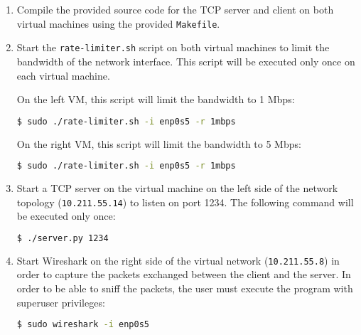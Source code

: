 \documentclass[a4paper, 11pt]{article}
\begin{document}
\begin{enumerate}
	\item Compile the provided source code for the TCP server and client on both virtual machines using the provided \texttt{Makefile}.
	\item Start the \texttt{rate-limiter.sh} script on both virtual machines to limit the bandwidth of the network interface. This script will be executed only once on each virtual machine.

	      On the left VM, this script will limit the bandwidth to 1 Mbps:
	      \begin{adjustwidth}{-10cm}{}
		      \begin{lstlisting}[language=bash]
						$ sudo ./rate-limiter.sh -i enp0s5 -r 1mbps 
					\end{lstlisting}
	      \end{adjustwidth}

	      On the right VM, this script will limit the bandwidth to 5 Mbps:

	      \begin{adjustwidth}{-10cm}{}
		      \begin{lstlisting}[language=bash]
						$ sudo ./rate-limiter.sh -i enp0s5 -r 1mbps 
					\end{lstlisting}
	      \end{adjustwidth}
	\item Start a TCP server on the virtual machine on the left side of the network topology (\texttt{10.211.55.14}) to listen on port 1234. The following command will be executed only once:
	      \begin{adjustwidth}{-10cm}{}
		      \begin{lstlisting}[language=bash]
						$ ./server.py 1234
					\end{lstlisting}
	      \end{adjustwidth}

	\item Start Wireshark on the right side of the virtual network (\texttt{10.211.55.8}) in order to capture the packets exchanged between the client and the server. In order to be able to sniff the packets, the user must execute the program with superuser privileges:
	      \begin{adjustwidth}{-10cm}{}
		      \begin{lstlisting}[language=bash]
						$ sudo wireshark -i enp0s5
					\end{lstlisting}
	      \end{adjustwidth}


\end{enumerate}
\end{document}
